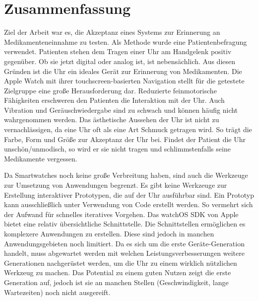 
\section{Zusammenfassung}
Ziel der Arbeit war es, die Akzeptanz eines Systems zur Erinnerung an Medikamenteneinnahme zu testen. Als Methode wurde eine Patientenbefragung verwendet. Patienten stehen dem Tragen einer Uhr am Handgelenk positiv gegenüber. Ob sie jetzt digital oder analog ist, ist nebensächlich. Aus diesen Gründen ist die Uhr ein ideales Gerät zur Erinnerung von Medikamenten. Die Apple Watch mit ihrer touchscreen-basierten Navigation stellt für die getestete Zielgruppe eine große Herausforderung dar. Reduzierte feinmotorische Fähigkeiten erschweren den Patienten die Interaktion mit der Uhr. Auch Vibration und Geräuschwiedergabe sind zu schwach und können häufig nicht wahrgenommen werden. Das ästhetische Aussehen der Uhr ist nicht zu vernachlässigen, da eine Uhr oft als eine Art Schmuck getragen wird. So trägt die Farbe, Form und Größe zur Akzeptanz der Uhr bei. Findet der Patient die Uhr unschön/unmodisch, so wird er sie nicht tragen und schlimmstenfalls seine Medikamente vergessen.

Da Smartwatches noch keine große Verbreitung haben, sind auch die Werkzeuge zur Umsetzung von Anwendungen begrenzt. Es gibt keine Werkzeuge zur Erstellung interaktiver Prototypen, die auf der Uhr ausführbar sind. Ein Prototyp kann ausschließlich unter Verwendung von Code erstellt werden. So vermehrt sich der Aufwand für schnelles iteratives Vorgehen. Das watchOS SDK von Apple bietet eine relativ übersichtliche Schnittstelle. Die Schnittstellen ermöglichen es komplexere Anwendungen zu erstellen. Diese sind jedoch in manchen Anwendungsgebieten noch limitiert. Da es sich um die erste Geräte-Generation handelt, muss abgewartet werden mit welchen Leistungsverbesserungen weitere Generationen nachgerüstet werden, um die Uhr zu einem wirklich nützlichen Werkzeug zu machen. Das Potential zu einem guten Nutzen zeigt die erste Generation auf, jedoch ist sie an manchen Stellen (Geschwindigkeit, lange Wartezeiten) noch nicht ausgereift.

